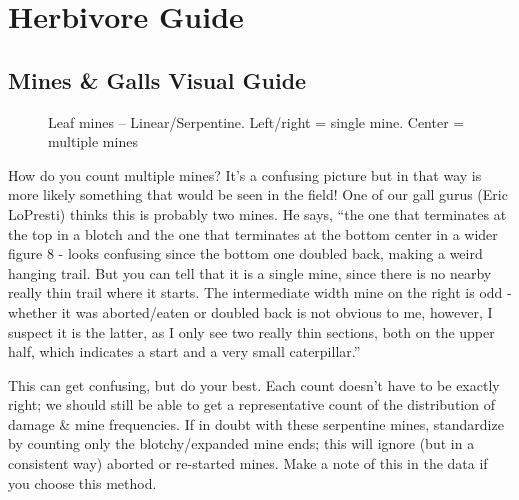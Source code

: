 \documentclass[
  letterpaper,
  DIV=11,
  numbers=noendperiod]{scrreprt}
\begin{document}
\section{Herbivore Guide}\label{herbivore-guide}

\subsection{Mines \& Galls Visual Guide}\label{mines-galls-visual-guide}

\begin{figure}


\caption{\label{fig-mines1}Leaf mines -- Linear/Serpentine. Left/right =
single mine. Center = multiple mines}

\end{figure}%

How do you count multiple mines? It's a confusing picture but in that
way is more likely something that would be seen in the field! One of our
gall gurus (Eric LoPresti) thinks this is probably two mines. He says,
``the one that terminates at the top in a blotch and the one that
terminates at the bottom center in a wider figure 8 - looks confusing
since the bottom one doubled back, making a weird hanging trail. But you
can tell that it is a single mine, since there is no nearby really thin
trail where it starts. The intermediate width mine on the right is odd -
whether it was aborted/eaten or doubled back is not obvious to me,
however, I suspect it is the latter, as I only see two really thin
sections, both on the upper half, which indicates a start and a very
small caterpillar.''

This can get confusing, but do your best. Each count doesn't have to be
exactly right; we should still be able to get a representative count of
the distribution of damage \& mine frequencies. If in doubt with these
serpentine mines, standardize by counting only the blotchy/expanded mine
ends; this will ignore (but in a consistent way) aborted or re-started
mines. Make a note of this in the data if you choose this method.
\end{document}
